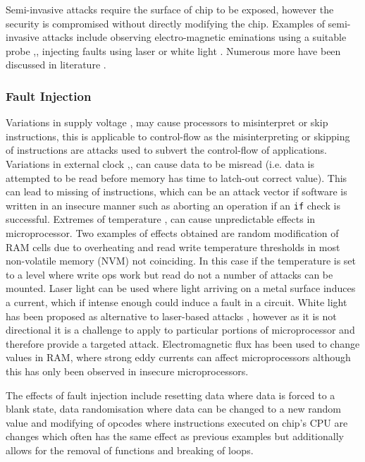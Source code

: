 Semi-invasive attacks require the surface of chip to be exposed, however the security is compromised without directly modifying the chip. Examples of semi-invasive attacks include observing electro-magnetic eminations using a suitable probe \cite{Gandolfi2007},\cite{Quisquater2001}, injecting faults using laser \cite{Bar-el2006} or white light \cite{Skorobogatov2007}. Numerous more have been discussed in literature \cite{Skorobogatov2005}.

\subsubsection{Fault Injection}

Variations in supply voltage \cite{Anderson1996},\cite{Blomer2010} may cause processors to misinterpret or skip instructions, this is applicable to control-flow as the misinterpreting or skipping of instructions are attacks used to subvert the control-flow of applications.
Variations in external clock \cite{Anderson1996},\cite{Street},\cite{Kommerling1999} can cause data to be misread (i.e. data is attempted to be read before memory has time to latch-out correct value). This can lead to missing of instructions, which can be an attack vector if software is written in an insecure manner such as aborting an operation if an \verb|if| check is successful.
Extremes of temperature \cite{Boneh},\cite{Govindavajhala2003} can cause unpredictable effects in microprocessor. Two examples of effects obtained \cite{Bar-el2006} are random modification of RAM cells due to overheating and read write temperature thresholds in most non-volatile memory (NVM) not coinciding. In this case if the temperature is set to a level where write ops work but read do not a number of attacks can be mounted. Laser light \cite{Habing1965} can be used where light arriving on a metal surface induces a current, which if intense enough could induce a fault in a circuit. White light \cite{Anderson1996} has been proposed as alternative to laser-based attacks  \cite{Skorobogatov2007}, however as it is not directional it is a challenge to apply to particular portions of microprocessor and therefore provide a targeted attack. Electromagnetic flux \cite{Samyde2003} has been used to change values in RAM, where strong eddy currents can affect microprocessors although this has only been observed in insecure microprocessors.

The effects of fault injection include resetting data where data is forced to a blank state, data randomisation where data can be changed to a new random value and modifying of opcodes where instructions executed on chip's CPU are changes\cite{Anderson1996} which often has the same effect as previous examples but additionally allows for the removal of functions and breaking of loops. 
\ifnotesincluded
{}
\fi
  
